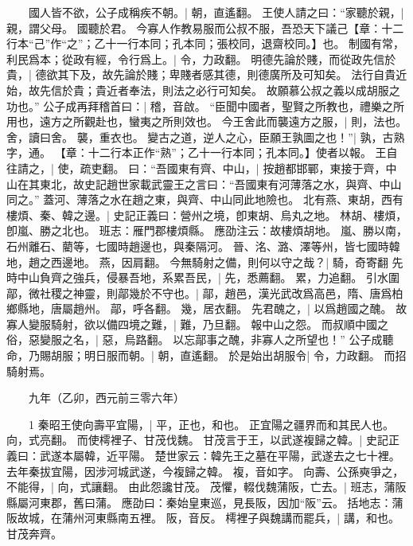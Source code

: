 　　國人皆不欲，公子成稱疾不朝。|{
	朝，直遙翻。
}
王使人請之曰：“家聽於親，|{
	親，謂父母。
}
國聽於君。
	今寡人作教易服而公叔不服，吾恐天下議己【章：十二行本“己”作“之”；乙十一行本同；孔本同；張校同，退齋校同。】也。
	制國有常，利民爲本；從政有經，令行爲上。|{
	令，力政翻。
}
明德先論於賤，而從政先信於貴，|{
	德欲其下及，故先論於賤；卑賤者感其德，則德廣所及可知矣。
	法行自貴近始，故先信於貴；貴近者奉法，則法之必行可知矣。
}
故願慕公叔之義以成胡服之功也。”
公子成再拜稽首曰：|{
	稽，音啟。
}
“臣聞中國者，聖賢之所教也，禮樂之所用也，遠方之所觀赴也，蠻夷之所則效也。
	今王舍此而襲遠方之服，|{
	則，法也。
	舍，讀曰舍。
	襲，重衣也。
}
變古之道，逆人之心，臣願王孰圖之也！”|{
	孰，古熟字，通。
}
【章：十二行本正作“熟”；乙十一行本同；孔本同。】使者以報。
	王自往請之，|{
	使，疏吏翻。
}
曰：“吾國東有齊、中山，|{
	按趙都邯鄲，東接于齊，中山在其東北，故史記趙世家載武靈王之言曰：“吾國東有河薄落之水，與齊、中山同之。”
	蓋河、薄落之水在趙之東，與齊、中山同此地險也。
}
北有燕、東胡，西有樓煩、秦、韓之邊。|{
	史記正義曰：營州之境，卽東胡、烏丸之地。
	林胡、樓煩，卽嵐、勝之北也。
	班志：雁門郡樓煩縣。
	應劭注云：故樓煩胡地。
	嵐、勝以南，石州離石、藺等，七國時趙邊也，與秦隔河。
	晉、洺、潞、澤等州，皆七國時韓地，趙之西邊地。
	燕，因肩翻。
}
今無騎射之備，則何以守之哉？|{
	騎，奇寄翻
	}
先時中山負齊之強兵，侵暴吾地，系累吾民，|{
	先，悉薦翻。
	累，力追翻。
}
引水圍鄗，微社稷之神靈，則鄗幾於不守也。|{
	鄗，趙邑，漢光武改爲高邑，隋、唐爲柏鄉縣地，唐屬趙州。
	鄗，呼各翻。
	幾，居衣翻。
}
先君醜之，|{
	以爲趙國之醜。
}
故寡人變服騎射，欲以備四境之難，|{
	難，乃旦翻。
}
報中山之怨。
	而叔順中國之俗，惡變服之名，|{
	惡，烏路翻。
}
以忘鄗事之醜，非寡人之所望也！”
公子成聽命，乃賜胡服；明日服而朝。|{
	朝，直遙翻。
}
於是始出胡服令|{
	令，力政翻。
}
而招騎射焉。


　　九年（乙卯，西元前三零六年）

　　1 秦昭王使向壽平宜陽，|{
	平，正也，和也。
	正宜陽之疆界而和其民人也。
	向，式亮翻。
}
而使樗裡子、甘茂伐魏。
	甘茂言于王，以武遂複歸之韓。|{
	史記正義曰：武遂本屬韓，近平陽。
	楚世家云：韓先王之墓在平陽，武遂去之七十裡。
	去年秦拔宜陽，因涉河城武遂，今複歸之韓。
	複，音如字。
}
向壽、公孫奭爭之，不能得，|{
	向，式讓翻。
}
由此怨讒甘茂。
	茂懼，輟伐魏蒲阪，亡去。|{
	班志，蒲阪縣屬河東郡，舊曰蒲。
	應劭曰：秦始皇東巡，見長阪，因加“阪”云。
	括地志：蒲阪故城，在蒲州河東縣南五裡。
	阪，音反。
}
樗裡子與魏講而罷兵，|{
	講，和也。
}
甘茂奔齊。


